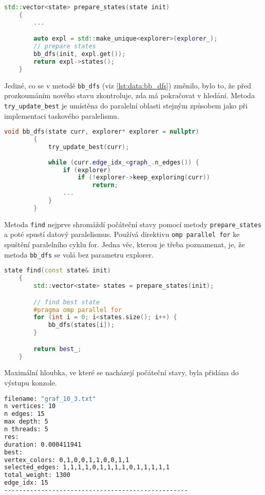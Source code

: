 \begin{lstlisting}[language=C++, label={lst:data:prepare_states}, title={Metoda pro přípravu počátečních stavů}]
    std::vector<state> prepare_states(state init)
    {
        ...

        auto expl = std::make_unique<explorer>(explorer_);
        // prepare states
        bb_dfs(init, expl.get());
        return expl->states();
    }
\end{lstlisting}

Jediné, co se v metodě \texttt{bb\_dfs} (viz \ref{lst:data:bb_dfs}) změnilo, bylo to, že před prozkoumáním nového stavu zkontroluje, zda má pokračovat v hledání.
Metoda \texttt{try\_update\_best} je umístěna do paralelní oblasti stejným způsobem jako při implementaci taskového paralelismu.

\begin{lstlisting}[language=C++, label={lst:data:bb_dfs}, title={Metoda pro prohledávání stavového prostoru}]
        void bb_dfs(state curr, explorer* explorer = nullptr)
        {
            try_update_best(curr);
            
            while (curr.edge_idx_<graph_.n_edges()) {
                if (explorer)
                    if (!explorer->keep_exploring(curr))
                        return;
                ...
            }
        }
\end{lstlisting}

Metoda \texttt{find} nejprve shromáždí počáteční stavy pomocí metody \texttt{prepare\_states} a poté spustí datový paralelismus.
Používá direktivu \texttt{omp parallel for} ke spuštění paralelního cyklu for.
Jedna věc, kterou je třeba poznamenat, je, že metoda \texttt{bb\_dfs} se volá bez parametru explorer.

\begin{lstlisting}[language=C++, label={lst:data:find}, title={Metoda pro nalezení nejlepšího stavu}]
    state find(const state& init)
    {
        std::vector<state> states = prepare_states(init);

        // find best state
        #pragma omp parallel for
        for (int i = 0; i<states.size(); i++) {
            bb_dfs(states[i]);
        }

        return best_;
    }
\end{lstlisting}

Maximální hloubka, ve které se nacházejí počáteční stavy, byla přidána do výstupu konzole.

\begin{lstlisting}[language=bash, label={lst:data:console_log}, title={Příklad výpisu výsledků}]
filename: "graf_10_3.txt"
n vertices: 10
n edges: 15
max depth: 5
n threads: 5
res:
duration: 0.000411941
best:
vertex_colors: 0,1,0,0,1,1,0,0,1,1
selected_edges: 1,1,1,1,0,1,1,1,1,0,1,1,1,1,1
total_weight: 1300
edge_idx: 15
--------------------------------------------------
\end{lstlisting}









